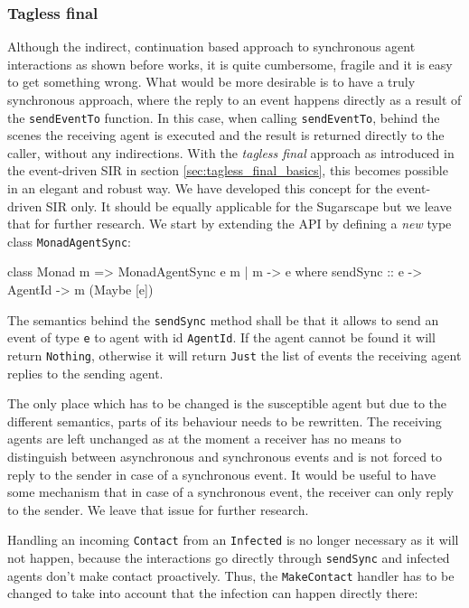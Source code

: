 \subsubsection{Tagless final}
Although the indirect, continuation based approach to synchronous agent interactions as shown before works, it is quite cumbersome, fragile and it is easy to get something wrong. What would be more desirable is to have a truly synchronous approach, where the reply to an event happens directly as a result of the \texttt{sendEventTo} function. In this case, when calling \texttt{sendEventTo}, behind the scenes the receiving agent is executed and the result is returned directly to the caller, without any indirections. With the \textit{tagless final} approach as introduced in the event-driven SIR in section \ref{sec:tagless_final_basics}, this becomes possible in an elegant and robust way. We have developed this concept for the event-driven SIR only. It should be equally applicable for the Sugarscape but we leave that for further research. We start by extending the API by defining a \textit{new} type class \texttt{MonadAgentSync}:

\begin{HaskellCode}
class Monad m => MonadAgentSync e m | m -> e where
  sendSync :: e -> AgentId -> m (Maybe [e])
\end{HaskellCode}

The semantics behind the \texttt{sendSync} method shall be that it allows to send an event of type \texttt{e} to agent with id \texttt{AgentId}. If the agent cannot be found it will return \texttt{Nothing}, otherwise it will return \texttt{Just} the list of events the receiving agent replies to the sending agent. 

The only place which has to be changed is the susceptible agent but due to the different semantics, parts of its behaviour needs to be rewritten. The receiving agents are left unchanged as at the moment a receiver has no means to distinguish between asynchronous and synchronous events and is not forced to reply to the sender in case of a synchronous event. It would be useful to have some mechanism that in case of a synchronous event, the receiver can only reply to the sender. We leave that issue for further research.

Handling an incoming \texttt{Contact} from an \texttt{Infected} is no longer necessary as it will not happen, because the interactions go directly through \texttt{sendSync} and infected agents don't make contact proactively. Thus, the \texttt{MakeContact} handler has to be changed to take into account that the infection can happen directly there:

